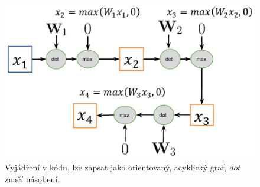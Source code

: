 \begin{figure}[H]
    \centering
    \includegraphics[width=0.7\linewidth]{nn_graph.pdf}
    \caption{Vyjádření v kódu, lze zapsat jako orientovaný, acyklický graf, $dot$ značí násobení.}
\end{figure}
